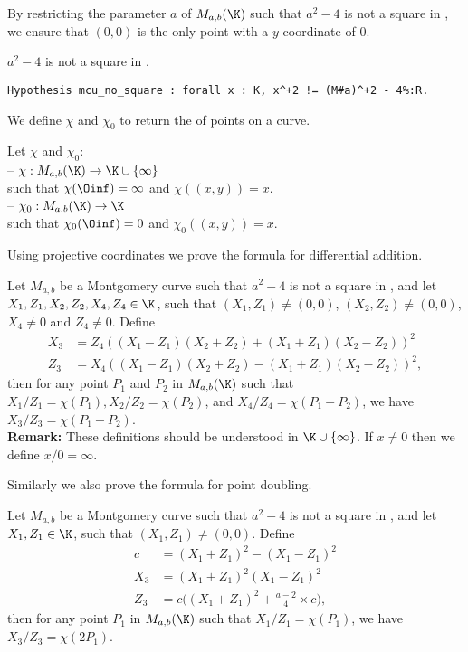 By restricting the parameter $a$ of $M_{a,b}(\K)$ such that $a^2-4$ is not a
square in \K, we ensure that $(0,0)$ is the only point with a $y$-coordinate of $0$.
\begin{hypothesis}
\label{hyp:a_minus_4_not_square}
$a^2-4$ is not a square in \K.
\end{hypothesis}
\begin{lstlisting}[language=Coq]
Hypothesis mcu_no_square : forall x : K, x^+2 != (M#a)^+2 - 4%:R.
\end{lstlisting}

We define $\chi$ and $\chi_0$ to return the \xcoord of points on a curve.
\begin{dfn}Let $\chi$ and $\chi_0$:\\
-- $\chi : M_{a,b}(\K) \to \K \cup \{\infty\}$\\
  such that $\chi(\Oinf) = \infty$ and $\chi((x,y)) = x$.\\
-- $\chi_0 : M_{a,b}(\K) \to \K$\\
  such that $\chi_0(\Oinf) = 0$ and $\chi_0((x,y)) = x$.
\end{dfn}
Using projective coordinates we prove the formula for differential addition.%
\begin{lemma}
\label{lemma:xADD}
Let $M_{a,b}$ be a Montgomery curve such that $a^2-4$ is not a square in \K, and
let $X_1, Z_1, X_2, Z_2, X_4, Z_4 \in \K$, such that $(X_1,Z_1) \neq (0,0)$,
$(X_2,Z_2) \neq (0,0)$, $X_4 \neq 0$ and $Z_4 \neq 0$.
Define
\begin{align*}
X_3 &= Z_4((X_1 - Z_1)(X_2+Z_2) + (X_1+Z_1)(X_2-Z_2))^2\\
Z_3 &= X_4((X_1 - Z_1)(X_2+Z_2) - (X_1+Z_1)(X_2-Z_2))^2,
\end{align*}
then for any point $P_1$ and $P_2$ in $M_{a,b}(\K)$ such that
$X_1/Z_1 = \chi(P_1), X_2/Z_2 = \chi(P_2)$, and $X_4/Z_4 = \chi(P_1 - P_2)$,
we have $X_3/Z_3 = \chi(P_1+P_2)$.\\
\textbf{Remark:}
These definitions should be understood in $\K \cup \{\infty\}$.
If $x\ne 0$ then we define $x/0 = \infty$.
\end{lemma}
Similarly we also prove the formula for point doubling.%
\begin{lemma}
\label{lemma:xDBL}
Let $M_{a,b}$ be a Montgomery curve such that $a^2-4$ is not a square in \K, and
let $X_1, Z_1 \in \K$, such that $(X_1,Z_1) \neq (0,0)$. Define
\begin{align*}
  c &= (X_1 + Z_1)^2 - (X_1 - Z_1)^2\\
X_3 &= (X_1 + Z_1)^2(X_1-Z_1)^2\\
Z_3 &= c\Big((X_1 + Z_1)^2+\frac{a-2}{4}\times c\Big),
\end{align*}
then for any point $P_1$ in $M_{a,b}(\K)$ such that $X_1/Z_1 = \chi(P_1)$,
we have $X_3/Z_3 = \chi(2P_1)$.
\end{lemma}


